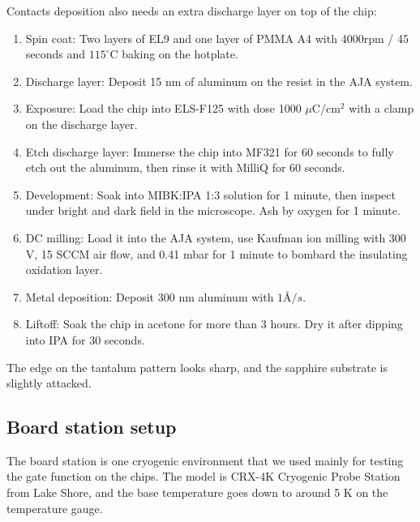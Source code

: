 Contacts deposition also needs an extra discharge layer on top of the chip:
\begin{enumerate}
    \item Spin coat: Two layers of EL9 and one layer of PMMA A4 with 4000rpm / 45 seconds and $115^\circ$C baking on the hotplate.
    \item Discharge layer: Deposit 15 nm of aluminum on the resist in the AJA system. 
    \item Exposure: Load the chip into ELS-F125 with dose 1000 $\mu$C/cm$^2$ with a clamp on the discharge layer.
    \item Etch discharge layer: Immerse the chip into MF321 for 60 seconds to fully etch out the aluminum, then rinse it with MilliQ for 60 seconds.
    \item Development: Soak into MIBK:IPA 1:3 solution for 1 minute, then inspect under bright and dark field in the microscope. Ash by oxygen for 1 minute.
    \item DC milling: Load it into the AJA system, use Kaufman ion milling with 300 V, 15 SCCM air flow, and 0.41 mbar for 1 minute to bombard the insulating oxidation layer.
    \item Metal deposition: Deposit 300 nm aluminum with $1 \text{\AA} / s$.
    \item Liftoff: Soak the chip in acetone for more than 3 hours. Dry it after dipping into IPA for 30 seconds. 
\end{enumerate}

The edge on the tantalum pattern looks sharp, and the sapphire substrate is slightly attacked. 


\subsection{Board station setup}

The board station is one cryogenic environment that we used mainly for testing the gate function on the chips. The model is CRX-4K Cryogenic Probe Station from Lake Shore, and the base temperature goes down to around 5 K on the temperature gauge.

